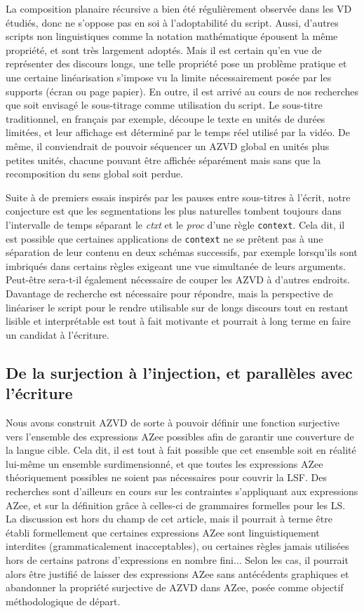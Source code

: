 \documentclass[french,utf8x]{article}
\newcommand{\AZee}[1]{\texttt{#1}}
\begin{document}
La composition planaire récursive a bien été régulièrement observée dans les VD étudiés, donc ne s'oppose pas en soi à l'adoptabilité du script.
Aussi, d'autres scripts non linguistiques comme la notation mathématique épousent la même propriété, et sont très largement adoptés.
Mais il est certain qu'en vue de représenter des discours longs, une telle propriété pose un problème pratique et une certaine linéarisation s'impose vu la limite nécessairement posée par les supports (écran ou page papier).
En outre, il est arrivé au cours de nos recherches que soit envisagé le sous-titrage comme utilisation du script.
Le sous-titre traditionnel, en français par exemple, découpe le texte en unités de durées limitées, et leur affichage est déterminé par le temps réel utilisé par la vidéo.
De même, il conviendrait de pouvoir séquencer un AZVD global en unités plus petites unités, chacune pouvant être affichée séparément mais sans que la recomposition du sens global soit perdue.

Suite à de premiers essais inspirés par les pauses entre sous-titres à l'écrit, notre conjecture est que les segmentations les plus naturelles tombent toujours dans l'intervalle de temps séparant le \emph{ctxt} et le \emph{proc} d'une règle \AZee{context}.
Cela dit, il est possible que certaines applications de \AZee{context} ne se prêtent pas à une séparation de leur contenu en deux schémas successifs, par exemple lorsqu'ils sont imbriqués dans certains règles exigeant une vue simultanée de leurs arguments.
Peut-être sera-t-il également nécessaire de couper les AZVD à d'autres endroits.
Davantage de recherche est nécessaire pour répondre, mais la perspective de linéariser le script pour le rendre utilisable sur de longs discours tout en restant lisible et interprétable est tout à fait motivante et pourrait à long terme en faire un candidat à l'écriture.


\subsection{De la surjection à l'injection, et parallèles avec l'écriture}

Nous avons construit AZVD de sorte à pouvoir définir une fonction surjective vers l'ensemble des expressions AZee possibles afin de garantir une couverture de la langue cible.
Cela dit, il est tout à fait possible que cet ensemble soit en réalité lui-même un ensemble surdimensionné, et que toutes les expressions AZee théoriquement possibles ne soient pas nécessaires pour couvrir la LSF.
Des recherches sont d'ailleurs en cours sur les contraintes s'appliquant aux expressions AZee, et sur la définition grâce à celles-ci de grammaires formelles pour les LS.
La discussion est hors du champ de cet article, mais il pourrait à terme être établi formellement que certaines expressions AZee sont linguistiquement interdites (grammaticalement inacceptables), ou certaines règles jamais utilisées hors de certains patrons d'expressions en nombre fini...
Selon les cas, il pourrait alors être justifié de laisser des expressions AZee sans antécédents graphiques et abandonner la propriété surjective de AZVD dans AZee, posée comme objectif méthodologique de départ.
\end{document}

